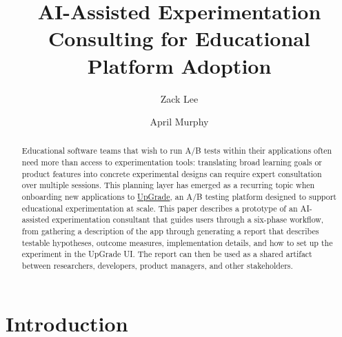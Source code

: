 \documentclass[manuscript,screen]{acmart}
\begin{document}
\title{AI-Assisted Experimentation Consulting for Educational Platform Adoption}

%
\author{Zack Lee}

\author{April Murphy}

\renewcommand{\shortauthors}{Lee and Murphy}

\begin{abstract}
Educational software teams that wish to run A/B tests within their applications often need more than access to experimentation tools: translating broad learning goals or product features into concrete experimental designs can require expert consultation over multiple sessions. This planning layer has emerged as a recurring topic when onboarding new applications to \href{https://www.upgradeplatform.org/}{UpGrade}, an A/B testing platform designed to support educational experimentation at scale. This paper describes a prototype of an AI-assisted experimentation consultant that guides users through a six-phase workflow, from gathering a description of the app through generating a report that describes testable hypotheses, outcome measures, implementation details, and how to set up the experiment in the UpGrade UI. The report can then be used as a shared artifact between researchers, developers, product managers, and other stakeholders. 
\end{abstract}



\maketitle

\section{Introduction}
\end{document}
